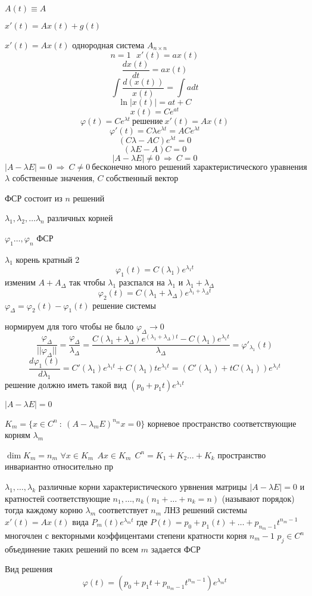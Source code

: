 \begin{define}
  $A(t) \equiv A$

  $x'(t) = Ax(t) + g(t)$

  $x'(t) = Ax(t)$ однородная система $A_{n\times n}$
  $$
  n=1 ~~~ x'(t) = ax(t)
  $$
  $$
  \frac{dx(t)}{dt} = ax(t)
  $$
  $$
  \int \frac{d(x(t))}{x(t)} = \int a dt
  $$
  $$
  \ln |x(t)| = at + C
  $$
  $$
  x(t) = Ce^{at}
  $$
  $$
  \varphi(t) = Ce^{\lambda t} ~ \text{решение} ~ x'(t) = Ax(t)
  $$
  $$
  \varphi'(t) = C \lambda e^{\lambda t} = ACe^{\lambda t}
  $$
  $$
  (C\lambda - AC)e^{\lambda t} = 0
  $$
  $$
  (\lambda E - A)C = 0
  $$
  $$
  |A - \lambda E| \not= 0 ~ \Rightarrow ~ C = 0
  $$
  $$
  |A - \lambda E| = 0 ~ \Rightarrow ~ C \not= 0 ~ \text{бесконечно много
  решений характеристического уравнения}
  $$
  $\lambda$ собственные значения, $C$ собственный вектор

  ФСР состоит из $n$ решений

  $\lambda_1, \lambda_2, \ldots \lambda_n$ различных корней

  $\varphi_1 \ldots, \varphi_n$ ФСР

  $\lambda_1$ корень кратный 2
  $$
  \varphi_1(t) = C(\lambda_1) e^{\lambda_1 t}
  $$
  изменим $A + A_{\Delta}$ так чтобы $\lambda_1$ разспался на $\lambda_1$ и
  $\lambda_1 + \lambda_{\Delta}$
  $$
  \varphi_2(t) = C(\lambda_1 + \lambda_{\Delta})e^{\lambda_1 +
  \lambda_{\Delta}t}
  $$
  $\varphi_{\Delta} = \varphi_2(t) - \varphi_1(t)$ решение системы

  нормируем для того чтобы не было $\varphi_{\Delta} \to 0$
  $$
  \frac{\varphi_{\Delta}}{||\varphi_{\Delta}||} =
  \frac{\varphi_{\Delta}}{\lambda_{\Delta}} =
  \frac{C(\lambda_1 + \lambda_{\Delta})e^{(\lambda_1 + \lambda_{\Delta})t} -
  C(\lambda_1)e^{\lambda_1 t}}{\lambda_{\Delta}} = \varphi'_{\lambda_1}(t)
  $$
  $$
  \frac{d \varphi_1(t)}{d\lambda_1} = C'(\lambda_1)e^{\lambda_1 t} +
  C(\lambda_1)t e^{\lambda_1 t} = (C'(\lambda_1) + t C(\lambda_1))
  e^{\lambda_1 t}
  $$
  решение должно иметь такой вид $(p_0 + p_1 t) e^{\lambda_1 t}$

  $|A - \lambda E| = 0$

  $K_m = \{x \in C^n ~ : ~ (A - \lambda_m E)^{n_m} x = 0\}$ корневое
  пространство соответствующие корням $\lambda_m$

  $\dim K_m = n_m$ $\forall x \in K_m ~~ Ax \in K_m ~~ C^n = K_1 + K_2 \ldots
  + K_k$ пространство инвариантно относительно пр
\end{define}

\begin{theorem}
  $\lambda_1, \ldots, \lambda_k$ различные корни характеристического урвнения
  матрицы $|A - \lambda E| = 0$ и кратностей соответствующие $n_1, \ldots, n_k
  (n_1 + \ldots + n_k = n)$ (называют порядок) тогда каждому корню $\lambda_m$
  соответствует $n_m$ ЛНЗ решений системы $x'(t) = Ax(t)$ вида $P_m(t)
  e^{\lambda_m t}$ где $P(t) = p_0 + p_1(t) + \ldots + p_{n_m-1}t^{n_m-1}$
  многочлен с векторными коэффицентами степени кратности корня $n_m - 1$
  $p_j \in C^n$ объединение таких решений по всем $m$ задается ФСР

  Вид решения
  $$
  \varphi(t) = (p_0 + p_1t + p_{n_m-1}t^{n_m-1})e^{\lambda_m t}
  $$
\end{theorem}

